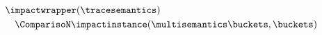 \begin{align*}
  &\impactwrapper(
    \tracesemantics
    ) \\
    &\quad\ComparisoN \impactinstance(\multisemantics\buckets, \buckets)
  \end{align*}
